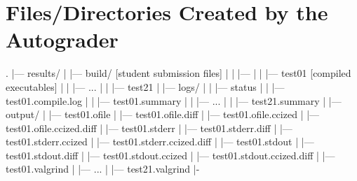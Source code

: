 \documentclass[11pt]{report}
\begin{document}
\section*{Files/Directories Created by the Autograder}
\begin{bashcodeblock}
.
|--- results/
|   |--- build/      [student submission files]
|   |   |--- 
|   |   |--- test01  [compiled executables]
|   |   |--- ...
|   |   |--- test21
|   |--- logs/
|   |   |--- status
|   |   |--- test01.compile.log
|   |   |--- test01.summary
|   |   |--- ...
|   |   |--- test21.summary
|   |--- output/
|       |--- test01.ofile
|       |--- test01.ofile.diff
|       |--- test01.ofile.ccized
|       |--- test01.ofile.ccized.diff
|       |--- test01.stderr
|       |--- test01.stderr.diff
|       |--- test01.stderr.ccized
|       |--- test01.stderr.ccized.diff 
|       |--- test01.stdout
|       |--- test01.stdout.diff
|       |--- test01.stdout.ccized
|       |--- test01.stdout.ccized.diff
|       |--- test01.valgrind
|       |--- ...
|       |--- test21.valgrind
|-
\end{bashcodeblock}
\end{document}
